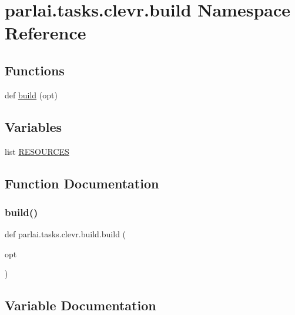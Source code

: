\hypertarget{namespaceparlai_1_1tasks_1_1clevr_1_1build}{}\section{parlai.\+tasks.\+clevr.\+build Namespace Reference}
\label{namespaceparlai_1_1tasks_1_1clevr_1_1build}
\subsection*{Functions}
\begin{DoxyCompactItemize}
\item 
def \hyperlink{namespaceparlai_1_1tasks_1_1clevr_1_1build_a129ccb17872c5d5b1538020e5642ab91}{build} (opt)
\end{DoxyCompactItemize}
\subsection*{Variables}
\begin{DoxyCompactItemize}
\item 
list \hyperlink{namespaceparlai_1_1tasks_1_1clevr_1_1build_a5fb1a9daed505a003a5cb86a140a3d5e}{R\+E\+S\+O\+U\+R\+C\+ES}
\end{DoxyCompactItemize}


\subsection{Function Documentation}
\mbox{\label{namespaceparlai_1_1tasks_1_1clevr_1_1build_a129ccb17872c5d5b1538020e5642ab91}} 
\subsubsection{\texorpdfstring{build()}{build()}}
{\footnotesize\ttfamily def parlai.\+tasks.\+clevr.\+build.\+build (\begin{DoxyParamCaption}\item[{}]{opt }\end{DoxyParamCaption})}



\subsection{Variable Documentation}
\mbox{\label{namespaceparlai_1_1tasks_1_1clevr_1_1build_a5fb1a9daed505a003a5cb86a140a3d5e}} 
